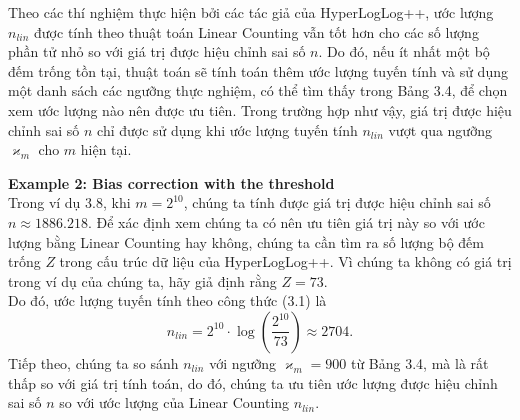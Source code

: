 \documentclass[letterpaper,13pt]{article}
\theoremstyle{mytheor}
\begin{document}
\indent Theo các thí nghiệm thực hiện bởi các tác giả của HyperLogLog++, ước lượng $n_{lin}$ được tính theo thuật toán 
Linear Counting vẫn tốt hơn cho các số lượng phần tử nhỏ so với giá trị được hiệu chỉnh sai số $n$. Do đó, nếu ít nhất một bộ đếm trống tồn tại, 
thuật toán sẽ tính toán thêm ước lượng tuyến tính và sử dụng một danh sách các ngưỡng thực nghiệm, có thể tìm thấy trong Bảng 3.4, để chọn xem ước lượng 
nào nên được ưu tiên. Trong trường hợp như vậy, giá trị được hiệu chỉnh sai số $n$ chỉ được sử dụng khi ước lượng tuyến tính $n_{lin}$ 
vượt qua ngưỡng $\varkappa_m$ cho $m$ hiện tại.
\begin{mdframed}
    \vspace{0.25cm}
    \textbf{Example 2: Bias correction with the threshold}\\
    Trong ví dụ 3.8, khi $m = 2^{10}$, chúng ta tính được giá trị được hiệu chỉnh sai số $n \approx 1886.218$. Để xác định xem chúng ta có nên 
    ưu tiên giá trị này so với ước lượng bằng Linear Counting hay không, chúng ta cần tìm ra số lượng bộ đếm trống $Z$ trong cấu trúc dữ liệu của 
    HyperLogLog++. Vì chúng ta không có giá trị trong ví dụ của chúng ta, hãy giả định rằng $Z = 73$.\\
    Do đó, ước lượng tuyến tính theo công thức (3.1) là
    \[n_{lin} = 2^{10} \cdot \log\left(\frac{2^{10}}{73}\right) \approx 2704.\]
    Tiếp theo, chúng ta so sánh $n_{lin}$ với ngưỡng $\varkappa_m = 900$ từ Bảng 3.4, mà là rất thấp so với giá trị tính toán, do đó, 
    chúng ta ưu tiên ước lượng được hiệu chỉnh sai số $n$ so với ước lượng của Linear Counting $n_{lin}$.
    
\end{mdframed}
    
\end{document}

